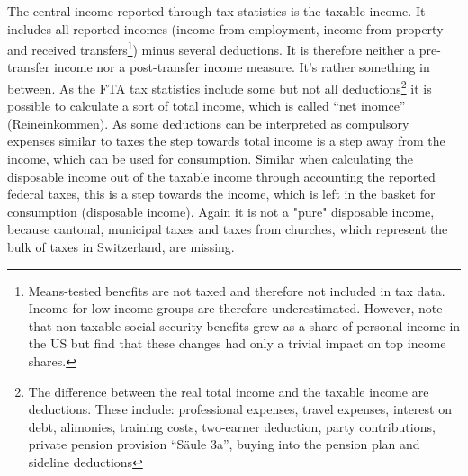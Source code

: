 \documentclass[twoside]{article}\usepackage[]{graphicx}\usepackage[]{color}
\begin{document}
\begin{multicols}{2}




The central income reported through tax statistics is the taxable income. It includes all reported incomes (income from employment, income from property and received transfers\footnote{Means-tested benefits are not taxed and therefore not included in tax data. Income for low income groups are therefore underestimated. However, \citep{piketty_income_2003} note that non-taxable social security benefits grew as a share of personal income in the US but find that these changes had only a trivial impact on top income shares.}) minus several deductions. It is therefore neither a pre-transfer income nor a post-transfer income measure. It's rather something in between. As the FTA tax statistics include some but not all deductions\footnote{The difference between the real total income and the taxable income are deductions. These include: professional expenses, travel expenses, interest on debt, alimonies, training costs, two-earner deduction, party contributions, private pension provision ``Säule 3a'', buying into the pension plan and sideline deductions} it is possible to calculate a sort of total income, which is called ``net inomce'' (Reineinkommen). As some deductions can be interpreted as compulsory expenses similar to taxes the step towards total income is a step away from the income, which can be used for consumption. Similar when calculating the disposable income out of the taxable income through accounting the reported federal taxes, this is a step towards the income, which is left in the basket for consumption (disposable income). Again it is not a "pure" disposable income, because cantonal, municipal taxes and taxes from churches, which represent the bulk of taxes in Switzerland, are missing.   \\   


\end{multicols}
\end{document}
